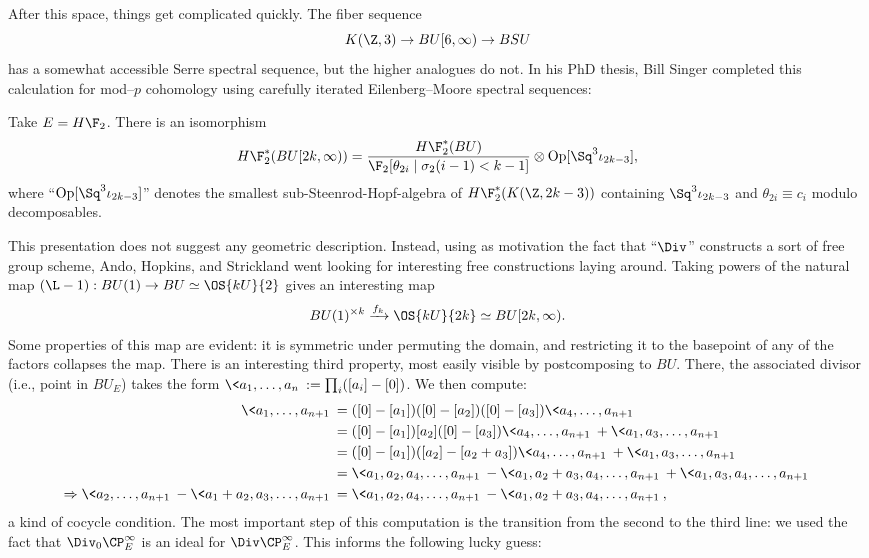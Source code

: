 After this space, things get complicated quickly.  The fiber sequence \[K(\Z, 3) \to BU[6, \infty) \to BSU\] has a somewhat accessible Serre spectral sequence, but the higher analogues do not.  In his PhD thesis, Bill Singer completed this calculation for mod--$p$ cohomology using carefully iterated Eilenberg--Moore spectral sequences:

\begin{theorem}
Take $E = H\F_2$.  There is an isomorphism \[H\F_2^*(BU[2k,\infty)) = \frac{H\F_2^*(BU)}{\F_2[\theta_{2i} \mid \sigma_2(i - 1) < k - 1]} \otimes \operatorname{Op}[\Sq^3 \iota_{2k-3}],\] where ``$\operatorname{Op}[\Sq^3 \iota_{2k-3}]$'' denotes the smallest sub-Steenrod-Hopf-algebra of $H\F_2^*(K(\Z, 2k-3))$ containing $\Sq^3 \iota_{2k-3}$ and $\theta_{2i} \equiv c_i$ modulo decomposables.
\end{theorem}

This presentation does not suggest any geometric description.  Instead, using as motivation the fact that ``$\Div$'' constructs a sort of free group scheme, Ando, Hopkins, and Strickland went looking for interesting free constructions laying around.  Taking powers of the natural map $(\L - 1): BU(1) \to BU \simeq \OS{kU}{2}$ gives an interesting map \[BU(1)^{\times k} \xrightarrow{f_k} \OS{kU}{2k} \simeq BU[2k, \infty).\]  Some properties of this map are evident: it is symmetric under permuting the domain, and restricting it to the basepoint of any of the factors collapses the map.  There is an interesting third property, most easily visible by postcomposing to $BU$.  There, the associated divisor (i.e., point in $BU_E$) takes the form $\<a_1, \ldots, a_n\> := \prod_i ([a_i] - [0])$.  We then compute:
\begin{align*}
\<a_1, \ldots, a_{n+1}\> & = ([0] - [a_1])([0] - [a_2])([0] - [a_3])\<a_4, \ldots, a_{n+1}\> \\
& = ([0] - [a_1])[a_2]([0] - [a_3])\<a_4, \ldots, a_{n+1}\> + \<a_1, a_3, \ldots, a_{n+1}\> \\
& = ([0] - [a_1])([a_2] - [a_2 + a_3])\<a_4, \ldots, a_{n+1}\> + \<a_1, a_3, \ldots, a_{n+1}\> \\
& = \<a_1, a_2, a_4, \ldots, a_{n+1}\> - \<a_1, a_2 + a_3, a_4, \ldots, a_{n+1}\> + \<a_1, a_3, a_4, \ldots, a_{n+1}\> \\
\Rightarrow \<a_2, \ldots, a_{n+1}\> - \<a_1 + a_2, a_3, \ldots, a_{n+1}\> & = \<a_1, a_2, a_4, \ldots, a_{n+1}\> - \<a_1, a_2 + a_3, a_4, \ldots, a_{n+1}\>,
\end{align*}
a kind of cocycle condition.  The most important step of this computation is the transition from the second to the third line: we used the fact that $\Div_0 \CP^\infty_E$ is an ideal for $\Div \CP^\infty_E$.  This informs the following lucky guess:

